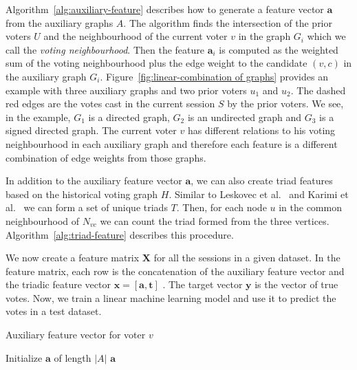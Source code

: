 Algorithm~\ref{alg:auxiliary-feature} describes how to generate a feature vector $\mathbf{a}$ from the auxiliary graphs $A$.
The algorithm finds the intersection of the prior voters $U$ and the neighbourhood of the current voter $v$ in the graph $G_i$ which we call the \textit{voting neighbourhood}.
Then the feature $\mathbf{a}_i$ is computed as the weighted sum of the voting neighbourhood plus the edge weight to the candidate $(v,c)$ in the auxiliary graph $G_{i}$.
Figure~\ref{fig:linear-combination of graphs} provides an example with three auxiliary graphs and two prior voters $u_1$ and $u_2$.
The dashed red edges are the votes cast in the current session $S$ by the prior voters.
We see, in the example, $G_1$ is a directed graph, $G_2$ is an undirected graph and $G_3$ is a signed directed graph.
The current voter $v$ has different relations to his voting neighbourhood in each auxiliary graph and therefore each feature is a different combination of edge weights from those graphs. 

In addition to the auxiliary feature vector $\mathbf{a}$, we can also create triad features based on the historical voting graph $H$.
Similar to Leskovec et al.\ \cite{leskovec2010predicting} and Karimi et al.\ \cite{karimi2019multicongress} we can form a set of unique triads $T$.
Then, for each node $u$ in the common neighbourhood of $N_{vc}$ we can count the triad formed from the three vertices.
Algorithm~\ref{alg:triad-feature} describes this procedure. 

We now create a feature matrix $\mathbf{X}$ for all the sessions in a given dataset.
In the feature matrix, each row is the concatenation of the auxiliary feature vector and the triadic feature vector $\mathbf{x} = [\mathbf{a},\mathbf{t}]$ .
The target vector $\mathbf{y}$ is the vector of true votes.
Now, we train a linear machine learning model and use it to predict the votes in a test dataset.

\begin{algorithm}[htp]
    \DontPrintSemicolon
    \caption{Auxiliary feature vector for voter $v$ }
    \label{alg:auxiliary-feature}
    Initialize $\mathbf{a}$ of length $|A|$\;
    \Return $\mathbf{a}$
\end{algorithm}

